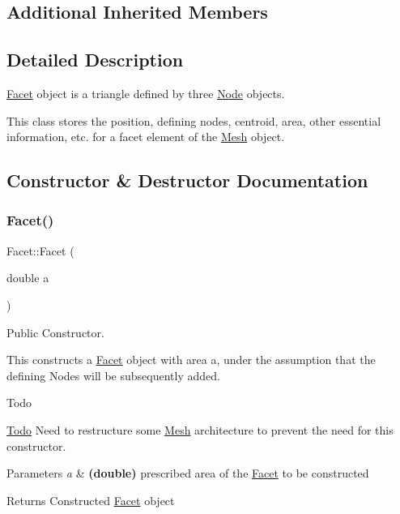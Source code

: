 \subsection*{Additional Inherited Members}


\subsection{Detailed Description}
\mbox{\hyperlink{class_facet}{Facet}} object is a triangle defined by three \mbox{\hyperlink{class_node}{Node}} objects. 

This class stores the position, defining nodes, centroid, area, other essential information, etc. for a facet element of the \mbox{\hyperlink{class_mesh}{Mesh}} object. 

\subsection{Constructor \& Destructor Documentation}
\mbox{\label{class_facet_acfcdcc63ac32fc2a1d0378a899441bbc}} 
\subsubsection{\texorpdfstring{Facet()}{Facet()}\hspace{0.1cm}{\footnotesize\ttfamily [1/2]}}
{\footnotesize\ttfamily Facet\+::\+Facet (\begin{DoxyParamCaption}\item[{double}]{a }\end{DoxyParamCaption})\hspace{0.3cm}{\ttfamily [inline]}}



Public Constructor. 

This constructs a \mbox{\hyperlink{class_facet}{Facet}} object with area a, under the assumption that the defining Nodes will be subsequently added. \begin{DoxyRefDesc}{Todo}
\item[\mbox{\hyperlink{todo__todo000006}{Todo}}]Need to restructure some \mbox{\hyperlink{class_mesh}{Mesh}} architecture to prevent the need for this constructor. \end{DoxyRefDesc}

\begin{DoxyParams}{Parameters}
{\em a} & {\bfseries (double)} prescribed area of the \mbox{\hyperlink{class_facet}{Facet}} to be constructed \\
\hline
\end{DoxyParams}
\begin{DoxyReturn}{Returns}
Constructed \mbox{\hyperlink{class_facet}{Facet}} object 
\end{DoxyReturn}
\mbox{\label{class_facet_aaecf4566bbdbfb3904d9c3ce6f7c41cf}} 
